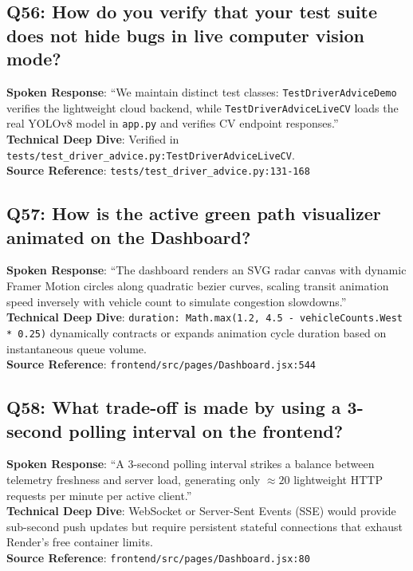 \subsection*{Q56: How do you verify that your test suite does not hide bugs in live computer vision mode?}
\begin{interviewbox}
\textbf{Spoken Response}: ``We maintain distinct test classes: \texttt{TestDriverAdviceDemo} verifies the lightweight cloud backend, while \texttt{TestDriverAdviceLiveCV} loads the real YOLOv8 model in \texttt{app.py} and verifies CV endpoint responses.''\\
\textbf{Technical Deep Dive}: Verified in \texttt{tests/test\_driver\_advice.py:TestDriverAdviceLiveCV}.\\
\textbf{Source Reference}: \texttt{tests/test\_driver\_advice.py:131-168}
\end{interviewbox}

\subsection*{Q57: How is the active green path visualizer animated on the Dashboard?}
\begin{interviewbox}
\textbf{Spoken Response}: ``The dashboard renders an SVG radar canvas with dynamic Framer Motion circles along quadratic bezier curves, scaling transit animation speed inversely with vehicle count to simulate congestion slowdowns.''\\
\textbf{Technical Deep Dive}: \texttt{duration: Math.max(1.2, 4.5 - vehicleCounts.West * 0.25)} dynamically contracts or expands animation cycle duration based on instantaneous queue volume.\\
\textbf{Source Reference}: \texttt{frontend/src/pages/Dashboard.jsx:544}
\end{interviewbox}

\subsection*{Q58: What trade-off is made by using a 3-second polling interval on the frontend?}
\begin{interviewbox}
\textbf{Spoken Response}: ``A 3-second polling interval strikes a balance between telemetry freshness and server load, generating only $\approx 20$ lightweight HTTP requests per minute per active client.''\\
\textbf{Technical Deep Dive}: WebSocket or Server-Sent Events (SSE) would provide sub-second push updates but require persistent stateful connections that exhaust Render's free container limits.\\
\textbf{Source Reference}: \texttt{frontend/src/pages/Dashboard.jsx:80}
\end{interviewbox}

